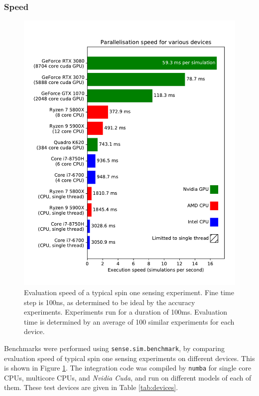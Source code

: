 \documentclass{jors}
\begin{document}
		\subsubsection*{Speed}
			\begin{figure}[htbp!]
				\centering
				\includegraphics[scale=0.7]{benchmark_device_aggregate.pdf}
				\caption{Evaluation speed of a typical spin one sensing experiment. Fine time step is 100ns, as determined to be ideal by the accuracy experiments. Experiments run for a duration of 100ms. Evaluation time is determined by an average of 100 similar experiments for each device.}
				\label{fig:benchmark_device_aggregate}
			\end{figure}

			Benchmarks were performed using \texttt{sense.sim.benchmark}, by comparing evaluation speed of typical spin one sensing experiments on different devices. This is shown in Figure \ref{fig:benchmark_device_aggregate}. The integration code was compiled by \texttt{numba} for single core CPUs, multicore CPUs, and \emph{Nvidia Cuda}, and run on different models of each of them. These test devices are given in Table \ref{tab:devices}.
\end{document}
